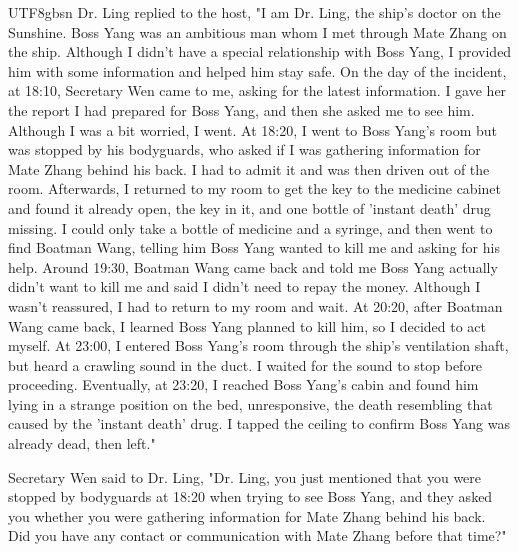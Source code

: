 \documentclass[11pt]{article}
\begin{document}
{\begin{CJK}{UTF8}{gbsn}
Dr. Ling replied to the host, "I am Dr. Ling, the ship's doctor on the Sunshine. Boss Yang was an ambitious man whom I met through Mate Zhang on the ship. Although I didn't have a special relationship with Boss Yang, I provided him with some information and helped him stay safe. On the day of the incident, at 18:10, Secretary Wen came to me, asking for the latest information. I gave her the report I had prepared for Boss Yang, and then she asked me to see him. Although I was a bit worried, I went. At 18:20, I went to Boss Yang's room but was stopped by his bodyguards, who asked if I was gathering information for Mate Zhang behind his back. I had to admit it and was then driven out of the room. Afterwards, I returned to my room to get the key to the medicine cabinet and found it already open, the key in it, and one bottle of 'instant death' drug missing. I could only take a bottle of medicine and a syringe, and then went to find Boatman Wang, telling him Boss Yang wanted to kill me and asking for his help. Around 19:30, Boatman Wang came back and told me Boss Yang actually didn't want to kill me and said I didn't need to repay the money. Although I wasn't reassured, I had to return to my room and wait. At 20:20, after Boatman Wang came back, I learned Boss Yang planned to kill him, so I decided to act myself. At 23:00, I entered Boss Yang's room through the ship's ventilation shaft, but heard a crawling sound in the duct. I waited for the sound to stop before proceeding. Eventually, at 23:20, I reached Boss Yang's cabin and found him lying in a strange position on the bed, unresponsive, the death resembling that caused by the 'instant death' drug. I tapped the ceiling to confirm Boss Yang was already dead, then left."

Secretary Wen said to Dr. Ling, "Dr. Ling, you just mentioned that you were stopped by bodyguards at 18:20 when trying to see Boss Yang, and they asked you whether you were gathering information for Mate Zhang behind his back. Did you have any contact or communication with Mate Zhang before that time?"


\end{CJK}}
\end{document}

